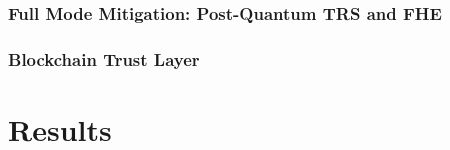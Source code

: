 \subsection{Full Mode Mitigation: Post-Quantum TRS and FHE}
\label{sec:pqc_mitigation}

\subsection{Blockchain Trust Layer}
\label{sec:blockchain}

\chapter{Results}
